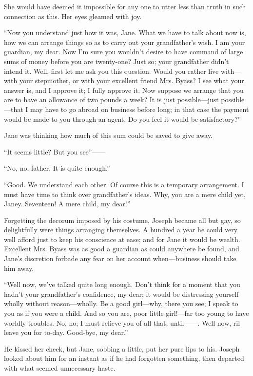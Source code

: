 She would have deemed it impossible for any one to utter less than truth
in such connection as this. Her eyes gleamed with joy.

``Now you understand just how it was, Jane. What we have to talk about
now is, how we can arrange things so as to carry out your grandfather's
wish. I am your guardian, my dear. Now I'm sure you wouldn't desire to
have command of large sums of money before you are twenty-one? Just so;
your {}grandfather didn't intend it. Well, first let me ask you this
question. Would you rather live with---with your stepmother, or with
your excellent friend Mrs. Byass? I see what your answer is, and I
approve it; I fully approve it. Now suppose we arrange that you are to
have an allowance of two pounds a week? It is just possible---just
possible---that I may have to go abroad on business before long; in that
case the payment would be made to you through an agent. Do you feel it
would be satisfactory?''

Jane was thinking how much of this sum could be saved to give away.

``It seems little? But you see''{{------}}

``No, no, father. It is quite enough.''

``Good. We understand each other. Of course this is a temporary
arrangement. I must have time to think over grandfather's ideas. Why,
you are a mere child yet, Janey. Seventeen! A mere child, my dear!''

Forgetting the decorum imposed by his costume, Joseph became all but
gay, so delightfully were things arranging themselves. A hundred a year
he could very well afford just to keep his conscience at ease; and for
Jane {}it would be wealth. Excellent Mrs. Byass was as good a guardian
as could anywhere be found, and Jane's discretion forbade any fear on
her account when---business should take him away.

``Well now, we've talked quite long enough. Don't think for a moment
that you hadn't your grandfather's confidence, my dear; it would be
distressing yourself wholly without reason---wholly. Be a good
girl---why, there you see; I speak to you as if you were a child. And so
you are, poor little girl!---far too young to have worldly troubles. No,
no; I must relieve you of all that, until{{------}}. Well now, ril leave
you for to-day. Good-bye, my dear.''

He kissed her cheek, but Jane, sobbing a little, put her pure lips to
his. Joseph looked about him for an instant as if he had forgotten
something, then departed with what seemed unnecessary haste.

